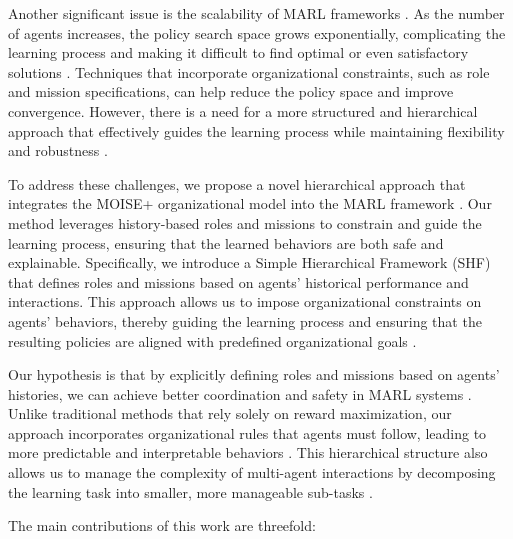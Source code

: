 \documentclass[sigconf,anonymous]{aamas}
\begin{document}
Another significant issue is the scalability of MARL frameworks \cite{chu2020multi}. As the number of agents increases, the policy search space grows exponentially, complicating the learning process and making it difficult to find optimal or even satisfactory solutions \cite{yang2018mean}. Techniques that incorporate organizational constraints, such as role and mission specifications, can help reduce the policy space and improve convergence. However, there is a need for a more structured and hierarchical approach that effectively guides the learning process while maintaining flexibility and robustness \cite{mataric1997using}.


To address these challenges, we propose a novel hierarchical approach that integrates the MOISE+ organizational model into the MARL framework \cite{hubner2007using}. Our method leverages history-based roles and missions to constrain and guide the learning process, ensuring that the learned behaviors are both safe and explainable. Specifically, we introduce a Simple Hierarchical Framework (SHF) that defines roles and missions based on agents' historical performance and interactions. This approach allows us to impose organizational constraints on agents' behaviors, thereby guiding the learning process and ensuring that the resulting policies are aligned with predefined organizational goals \cite{bastani2018verifiable, castaneda2019policy}.

Our hypothesis is that by explicitly defining roles and missions based on agents' histories, we can achieve better coordination and safety in MARL systems \cite{foerster2018counterfactual}. Unlike traditional methods that rely solely on reward maximization, our approach incorporates organizational rules that agents must follow, leading to more predictable and interpretable behaviors \cite{su2021toward}. This hierarchical structure also allows us to manage the complexity of multi-agent interactions by decomposing the learning task into smaller, more manageable sub-tasks \cite{yang2018mean}.


The main contributions of this work are threefold:
\end{document}
